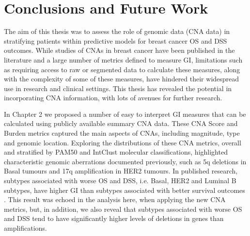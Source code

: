 \section{Conclusions and Future Work}
The aim of this thesis was to assess the role of genomic data (CNA data) in stratifying patients within predictive models for breast cancer OS and DSS outcomes. While studies of CNAs in breast cancer have been published in the literature and a large number of metrics defined to measure GI, limitations such as requiring access to raw or segmented data to calculate these measures, along with the complexity of some of these measures, have hindered their widespread use in research and clinical settings. This thesis has revealed the potential in incorporating CNA information, with lots of avenues for further research.  

In Chapter 2 we proposed a number of easy to interpret GI measures that can be calculated using publicly available summary CNA data. These CNA Score and Burden metrics captured the main aspects of CNAs, including magnitude, type and genomic location. Exploring the distributions of these CNA metrics, overall and stratified by PAM50 and IntClust molecular classifications, highlighted characteristic genomic aberrations documented previously, such as 5q deletions in Basal tumours and 17q amplification in HER2 tumours. In published research, subtypes associated with worse OS and DSS, i.e. Basal, HER2 and Luminal B subtypes, have higher GI than subtypes associated with better survival outcomes \citep{pmid22522925}. This result was echoed in the analysis here, when applying the new CNA metrics, but, in addition, we also reveal that subtypes associated with worse OS and DSS tend to have significantly higher levels of deletions in genes than amplifications. 

